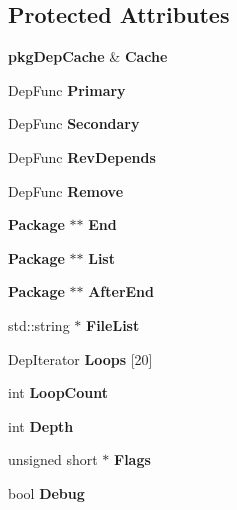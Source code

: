 \subsection*{\-Protected \-Attributes}
\begin{DoxyCompactItemize}
\item 
{\bf pkg\-Dep\-Cache} \& {\bfseries \-Cache}\label{classpkgOrderList_a55d171db69665a0bfc7ae2c2c5eef967}

\item 
\-Dep\-Func {\bfseries \-Primary}\label{classpkgOrderList_a5546736d2e83a782d3f7ac4d635cf472}

\item 
\-Dep\-Func {\bfseries \-Secondary}\label{classpkgOrderList_afe1ff87c87923e85b2c6f362186406ec}

\item 
\-Dep\-Func {\bfseries \-Rev\-Depends}\label{classpkgOrderList_a62b0aa91e9f74a81164f20bbdcda9327}

\item 
\-Dep\-Func {\bfseries \-Remove}\label{classpkgOrderList_ac505d54d0e8a22055af369f78929e15d}

\item 
{\bf \-Package} $\ast$$\ast$ {\bfseries \-End}\label{classpkgOrderList_ab1549f1b7d654347c653add5900a5294}

\item 
{\bf \-Package} $\ast$$\ast$ {\bfseries \-List}\label{classpkgOrderList_ad02d5f82648ca4dc520e04e5f6b7b605}

\item 
{\bf \-Package} $\ast$$\ast$ {\bfseries \-After\-End}\label{classpkgOrderList_ad07d18e4a57ed46850f81bca6029ecd8}

\item 
std\-::string $\ast$ {\bfseries \-File\-List}\label{classpkgOrderList_a60176670878b7368d9d6234718490870}

\item 
\-Dep\-Iterator {\bfseries \-Loops} [20]\label{classpkgOrderList_ac8b9b7a36dd7c40498da8d1de10de68c}

\item 
int {\bfseries \-Loop\-Count}\label{classpkgOrderList_aab567ac25e5165e0d709abe93d543127}

\item 
int {\bfseries \-Depth}\label{classpkgOrderList_ac66dbe0e082fd3cc29bc1572a4dccc09}

\item 
unsigned short $\ast$ {\bfseries \-Flags}\label{classpkgOrderList_a6a7498f8980a7209f8f1d86a457680b9}

\item 
bool {\bfseries \-Debug}\label{classpkgOrderList_acdf3472c9b75f32dae88032d42d1cb6c}

\end{DoxyCompactItemize}
